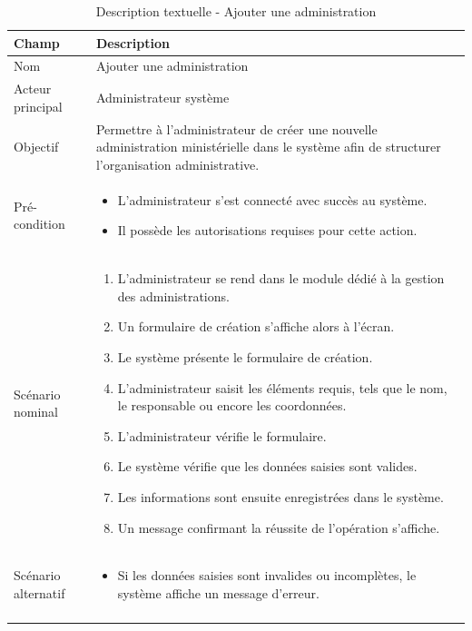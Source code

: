 \renewcommand{\arraystretch}{1.3}

\begin{longtable}{|p{4cm}|p{12cm}|}
\hline

\rowcolor{gray!20}
\textbf{Champ} & \textbf{Description} \\ \hline
\endfirsthead

 
Nom & Ajouter une administration \\ \hline

Acteur principal & Administrateur système \\ \hline

Objectif & Permettre à l’administrateur de créer une nouvelle administration ministérielle dans le système afin de structurer l’organisation administrative. \\ \hline

Pré-condition &
\begin{itemize}
    \item L'administrateur s'est connecté avec succès au système.
    \item Il possède les autorisations requises pour cette action.
\end{itemize}
\\ \hline

Scénario nominal &
\begin{enumerate}
    \item L'administrateur se rend dans le module dédié à la gestion des administrations.
    \item Un formulaire de création s'affiche alors à l'écran.
    \item Le système présente le formulaire de création.
    \item L'administrateur saisit les éléments requis, tels que le nom, le responsable ou encore les coordonnées.
    \item L'administrateur vérifie le formulaire.
    \item Le système vérifie que les données saisies sont valides.
    \item Les informations sont ensuite enregistrées dans le système. 
    \item Un message confirmant la réussite de l'opération s'affiche.
\end{enumerate}
\\ \hline

Scénario alternatif &
\begin{itemize}
    \item Si les données saisies sont invalides ou incomplètes, le système affiche un message d’erreur.
\end{itemize}
\\ \hline

\caption{Description textuelle - Ajouter une administration}
\label{tab:ajouter-admin}
\end{longtable}


